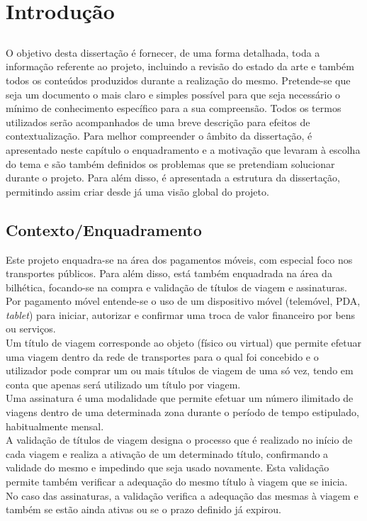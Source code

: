\chapter{Introdução} \label{chap:intro}

\section*{}

O objetivo desta dissertação é fornecer, de uma forma detalhada, toda a informação referente ao projeto, incluindo a revisão do estado da arte e também todos os conteúdos produzidos durante a realização do mesmo. Pretende-se que seja um documento o mais claro e simples possível para que seja necessário o mínimo de conhecimento específico para a sua compreensão. Todos os termos utilizados serão acompanhados de uma breve descrição para efeitos de contextualização.
Para melhor compreender o âmbito da dissertação, é apresentado neste capítulo o enquadramento e a motivação que levaram à escolha do tema e são também definidos os problemas que se pretendiam solucionar durante o projeto. Para além disso, é apresentada a estrutura da dissertação, permitindo assim criar desde já uma visão global do projeto.

\section{Contexto/Enquadramento} \label{sec:context}

Este projeto enquadra-se na área dos pagamentos móveis, com especial foco nos transportes públicos. Para além disso, está também enquadrada na área da bilhética, focando-se na compra e validação de títulos de viagem e assinaturas.
\\Por pagamento móvel entende-se o uso de um dispositivo móvel (telemóvel, PDA, \emph{tablet}) para iniciar, autorizar e confirmar uma troca de valor financeiro por bens ou serviços. \cite{Au2008141}
\\Um título de viagem corresponde ao objeto (físico ou virtual) que permite efetuar uma viagem dentro da rede de transportes para o qual foi concebido e o utilizador pode comprar um ou mais títulos de viagem de uma só vez, tendo em conta que apenas será utilizado um título por viagem.
\\Uma assinatura é uma modalidade que permite efetuar um número ilimitado de viagens dentro de uma determinada zona durante o período de tempo estipulado, habitualmente mensal.
\\A validação de títulos de viagem designa o processo que é realizado no início de cada viagem e realiza a ativação de um determinado título, confirmando a validade do mesmo e impedindo que seja usado novamente. Esta validação permite também verificar a adequação do mesmo título à viagem que se inicia. No caso das assinaturas, a validação verifica a adequação das mesmas à viagem e também se estão ainda ativas ou se o prazo definido já expirou.

